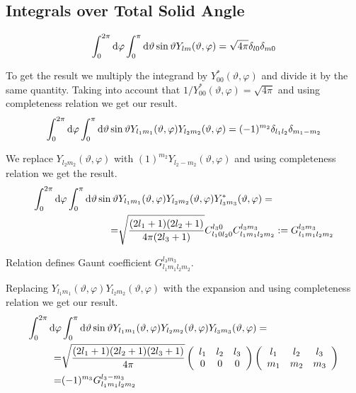 \subsection[Integrals ...]{Integrals over Total Solid Angle}
\begin{equation}
\int_{0}^{2\pi}\text{d} \varphi\int_{0}^{\pi}\text{d} \vartheta \sin \vartheta Y_{lm}(\vartheta,\varphi)=\sqrt{4\pi}\delta_{l0}\delta_{m0}
\end{equation}
\par{To get the result we multiply the integrand by $Y_{00}^{*}(\vartheta,\varphi)$ and
divide it by the same quantity. Taking into account that
$1/Y_{00}^{*}(\vartheta,\varphi)=\sqrt{4\pi}$ and using completeness relation
we get our result.}
\begin{equation}
\int_{0}^{2\pi}\text{d} \varphi\int_{0}^{\pi}\text{d} \vartheta \sin \vartheta Y_{l_1m_1}(\vartheta,\varphi)Y_{l_2m_2}(\vartheta,\varphi)=(-1)^{m_2}\delta_{l_1l_2}\delta_{m_1-m_2}
\end{equation}
\par{We replace $Y_{l_2m_2}(\vartheta,\varphi)$ with
$(1)^{m_2}Y_{l_2-m_2}(\vartheta,\varphi)$ and using completeness relation we
get the result.}
%
\begin{equation}
\label{gauntdef}
\begin{split}
\int_{0}^{2\pi}\td \varphi\int_{0}^{\pi}\td \vartheta \sin \vartheta
&Y_{l_1m_1}(\vartheta,\varphi)Y_{l_2m_2}(\vartheta,\varphi)Y_{l_3m_3}^{*}(\vartheta,\varphi)=\\=&\sqrt{\frac{(2l_1+1)(2l_2+1)}{4\pi(2l_3+1)}} C_{l_10l_20}^{l_30}C_{l_1m_1l_2m_2}^{l_3m_3}
:=G_{l_1m_1l_2m_2}^{l_3m_3}
\end{split}
\end{equation}
\par{Relation  defines Gaunt coefficient $G_{l_1m_1l_2m_2}^{l_3m_3}$.}
\par{Replacing $Y_{l_1m_1}(\vartheta,\varphi)Y_{l_2m_2}(\vartheta,\varphi)$ with
the expansion  and using completeness relation we get our result.}
\begin{equation}
\label{yjm3}
\begin{split}
\int_{0}^{2\pi}\td \varphi&\int_{0}^{\pi}\td \vartheta \sin \vartheta
Y_{l_1m_1}(\vartheta,\varphi)Y_{l_2m_2}(\vartheta,\varphi)Y_{l_3m_3}(\vartheta,\varphi)=\\=&\sqrt{\frac{(2l_1+1)(2l_2+1)(2l_3+1)}{4\pi}}
\tjm{l_1}{0}{l_2}{0}{l_3}{0}\tjm{l_1}{m_1}{l_2}{m_2}{l_3}{m_3}\\=&(-1)^{m_3}G_{l_1m_1l_2m_2}^{l_3-m_3}
\end{split}
\end{equation}
